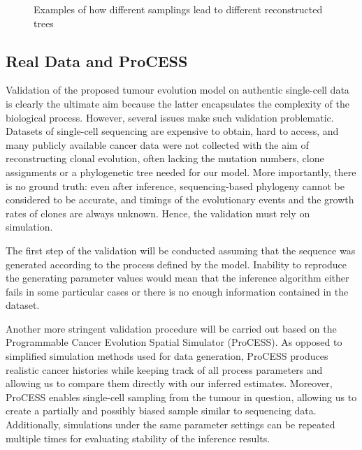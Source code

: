 \begin{figure}[H]
{
}
\captionsetup{font=footnotesize}
\caption{Examples of how different samplings lead to different reconstructed trees}
\label{fig:sampling-mrca}
\end{figure}

\subsection{Real Data and ProCESS}

Validation of the proposed tumour evolution model on authentic single-cell data is clearly the ultimate aim because the latter encapsulates the complexity of the biological process. However, several issues make such validation problematic. Datasets of single-cell sequencing are expensive to obtain, hard to access, and many publicly available cancer data were not collected with the aim of reconstructing clonal evolution, often lacking the mutation numbers, clone assignments or a phylogenetic tree needed for our model. More importantly, there is no ground truth: even after inference, sequencing-based phylogeny cannot be considered to be accurate, and timings of the evolutionary events and the growth rates of clones are always unknown. Hence, the validation must rely on simulation.

The first step of the validation will be conducted assuming that the sequence was generated according to the process defined by the model. Inability to reproduce the generating parameter values would mean that the inference algorithm either fails in some particular cases or there is no enough information contained in the dataset.

Another more stringent validation procedure will be carried out based on the Programmable Cancer Evolution Spatial Simulator (ProCESS). As opposed to simplified simulation methods used for data generation, ProCESS produces realistic cancer histories while keeping track of all process parameters and allowing us to compare them directly with our inferred estimates. Moreover, ProCESS enables single-cell sampling from the tumour in question, allowing us to create a partially and possibly biased sample similar to sequencing data. Additionally, simulations under the same parameter settings can be repeated multiple times for evaluating stability of the inference results.

